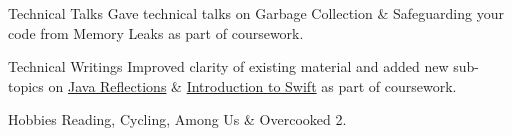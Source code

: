 


\begin{cvskills}


  \cvskill
  {Technical Talks}
  {Gave technical talks on Garbage Collection \& Safeguarding your code from Memory Leaks as part of coursework.}


  \cvskill
  {Technical Writings}
  {Improved clarity of existing material and added new sub-topics on \href{https://github.com/se-edu/learningresources/pull/30}{Java Reflections} \& \href{https://github.com/se-edu/learningresources/pull/31}{Introduction to Swift} \linebreak as part of coursework.}


  \cvskill
  {Hobbies}
  {Reading, Cycling, Among Us \& Overcooked 2.}


\end{cvskills}